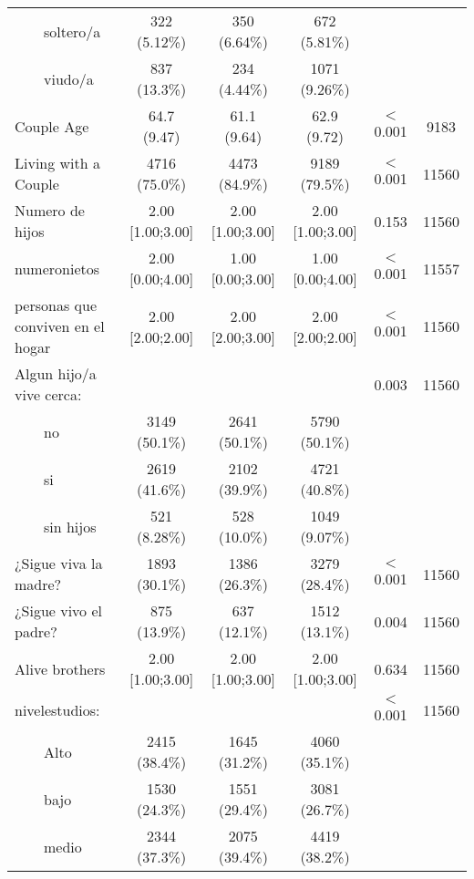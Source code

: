 \documentclass[a4paper,12pt, titlepage]{article}\usepackage[]{graphicx}\usepackage[]{color}
\begin{document}
\begin{landscape}
\begin{small}
\begin{longtable}{lccccc}
$\qquad$soltero/a &     322 (5.12\%)     &     350 (6.64\%)     &     672 (5.81\%)     &           &      \\ 
$\qquad$viudo/a &     837 (13.3\%)     &     234 (4.44\%)     &    1071 (9.26\%)     &           &      \\ 
Couple Age &     64.7 (9.47)     &     61.1 (9.64)     &     62.9 (9.72)     &  $<$0.001   & 9183 \\ 
Living with a Couple &    4716 (75.0\%)     &    4473 (84.9\%)     &    9189 (79.5\%)     &  $<$0.001   & 11560\\ 
Numero de hijos &  2.00 [1.00;3.00]   &  2.00 [1.00;3.00]   &  2.00 [1.00;3.00]   &   0.153   & 11560\\ 
numeronietos &  2.00 [0.00;4.00]   &  1.00 [0.00;3.00]   &  1.00 [0.00;4.00]   &  $<$0.001   & 11557\\ 
personas que conviven en el hogar &  2.00 [2.00;2.00]   &  2.00 [2.00;3.00]   &  2.00 [2.00;2.00]   &  $<$0.001   & 11560\\ 
Algun hijo‎/a vive cerca: &                     &                     &                     &   0.003   & 11560\\ 
$\qquad$no &    3149 (50.1\%)     &    2641 (50.1\%)     &    5790 (50.1\%)     &           &      \\ 
$\qquad$si &    2619 (41.6\%)     &    2102 (39.9\%)     &    4721 (40.8\%)     &           &      \\ 
$\qquad$sin hijos &     521 (8.28\%)     &     528 (10.0\%)     &    1049 (9.07\%)     &           &      \\ 
¿Sigue viva la madre? &    1893 (30.1\%)     &    1386 (26.3\%)     &    3279 (28.4\%)     &  $<$0.001   & 11560\\ 
¿Sigue vivo el padre? &     875 (13.9\%)     &     637 (12.1\%)     &    1512 (13.1\%)     &   0.004   & 11560\\ 
Alive brothers &  2.00 [1.00;3.00]   &  2.00 [1.00;3.00]   &  2.00 [1.00;3.00]   &   0.634   & 11560\\ 
nivelestudios: &                     &                     &                     &  $<$0.001   & 11560\\ 
$\qquad$Alto &    2415 (38.4\%)     &    1645 (31.2\%)     &    4060 (35.1\%)     &           &      \\ 
$\qquad$bajo &    1530 (24.3\%)     &    1551 (29.4\%)     &    3081 (26.7\%)     &           &      \\ 
$\qquad$medio &    2344 (37.3\%)     &    2075 (39.4\%)     &    4419 (38.2\%)     &           &      \\ 

\end{longtable}
\end{small}
\end{landscape}
\end{document}
